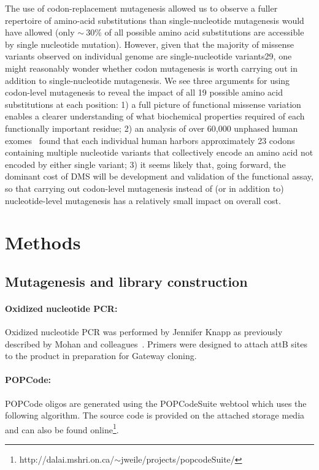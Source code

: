The use of codon-replacement mutagenesis allowed us to observe a fuller repertoire of amino-acid substitutions than single-nucleotide mutagenesis would have allowed (only $\sim~30\%$ of all possible amino acid substitutions are accessible by single nucleotide mutation).  However, given that the majority of missense variants observed on individual genome are single-nucleotide variants29, one might reasonably wonder whether codon mutagenesis is worth carrying out in addition to single-nucleotide mutagenesis.  We see three arguments for using codon-level mutagenesis to reveal the impact of all 19 possible amino acid substitutions at each position:  1) a full picture of functional missense variation enables a clearer understanding of what biochemical properties required of each functionally important residue; 2) an analysis of over 60,000 unphased human exomes~\cite{lek_analysis_2016} found that each individual human harbors approximately 23 codons containing multiple nucleotide variants that collectively encode an amino acid not encoded by either single variant; 3) it seems likely that, going forward, the dominant cost of DMS will be development and validation of the functional assay, so that carrying out codon-level mutagenesis instead of (or in addition to) nucleotide-level mutagenesis has a relatively small impact on overall cost.


\section{Methods}

\subsection{Mutagenesis and library construction}

\paragraph{Oxidized nucleotide PCR: } Oxidized nucleotide PCR was performed by Jennifer Knapp as previously described by Mohan and colleagues~\cite{mohan_pcr_2011}. Primers were designed to attach attB sites to the product in preparation for Gateway cloning.

\paragraph{POPCode:} POPCode oligos are generated using the POPCodeSuite webtool which uses the following algorithm. The source code is provided on the attached storage media and can also be found online\footnote{http://dalai.mshri.on.ca/$\sim$jweile/projects/popcodeSuite/}.

